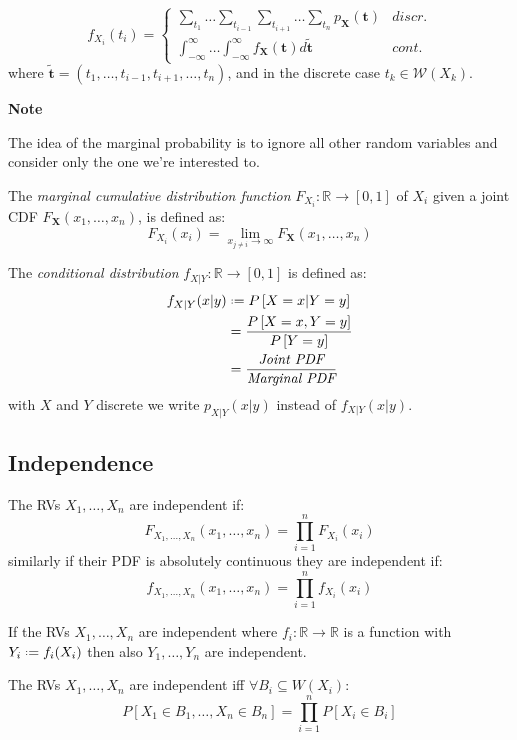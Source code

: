 \documentclass[8pt,a4paper]{extarticle}     %
\newcommand{\R}{\mathbb{R}}
\newcommand{\colnull}{\vfill\null\columnbreak}
\newcommand{\eqdef}{\mathrel{\vcenter{\baselineskip0.5ex\lineskiplimit0pt\hbox{\scriptsize.}\hbox{\scriptsize.}}}=}
\newcommand{\limcont}[3]{\lim\limits_{#1 \rightarrow #2}{#3}}
\renewcommand{\vec}[1]{\mathbf{#1}}
\begin{document}
\begin{multicols}{4}
\begin{boxdefinition}
	\[
		f_{X_i}(t_i) =
		\begin{cases}
			\displaystyle \sum_{t_1}\dots\sum_{t_{i-1}}\sum_{t_{i+1}}\dots\sum_{t_n} p_{\vec{X}}(\vec{t})  &\textit{discr.}\\[2em]
			\displaystyle \int_{-\infty}^{\infty}\dots\int_{-\infty}^{\infty} f_{\vec{X}}(\vec{t})d\vec{\tilde t} &\textit{cont.}
		\end{cases}
	\]
	where $\vec{\tilde t}=(t_1,\dots,t_{i-1},t_{i+1},\dots,t_n)$, and in the discrete case $t_k\in\mathcal{W}(X_k)$. 
\end{boxdefinition}
\begin{listb}
	\item [] \textbf{Note}
	\item The idea of the marginal probability is to ignore all other random variables and consider only the one we're interested to. 
\end{listb}
\begin{boxdefinition} 
	The \textit{marginal cumulative distribution function} $F_{X_i}:\R\rightarrow[0,1]$ of $X_i$ given a joint CDF $F_{\vec{X}}(x_1,\dots,x_n)$, is defined as:
	\[
		F_{X_i}(x_i) = \limcont{x_{j\neq i}}{\infty}{F_{\vec{X}}(x_1,\dots,x_n)}
	\]
\end{boxdefinition}
\begin{boxdefinition} 
	The \textit{conditional distribution} $f_{X|Y}:\R\rightarrow[0,1]$ is defined as:
	\[
		\begin{split}
			f_{X|Y}(x|y) 
			&\eqdef P\left[X=x|Y=y\right] \\ 
			&= \frac{P\left[X=x,Y=y\right]}{P\left[Y=y\right]}\\
			&= \frac{\textit{Joint PDF}}{\textit{Marginal PDF}}\\
		\end{split}
	\]
	with $X$ and $Y$ discrete we write $p_{X|Y}(x|y)$ instead of $f_{X|Y}(x|y)$.
\end{boxdefinition}
\subsection{Independence}
\begin{boxdefinition}[Independence] 
	The RVs $X_1,\dots,X_n$ are independent if:
	\[
		F_{X_1,\dots,X_n}(x_1,\dots,x_n) = \prod_{i=1}^{n} F_{X_i}(x_i)
	\]
	similarly if their PDF is absolutely continuous they are independent if:
	\[
		f_{X_1,\dots,X_n}(x_1,\dots,x_n) = \prod_{i=1}^{n} f_{X_i}(x_i)
	\]
\end{boxdefinition}
\begin{boxtheorem} 
	If the RVs $X_1,\dots,X_n$ are independent where $f_i:\R\rightarrow\R$ is a function with $Y_i\eqdef f_i(X_i)$ then also $Y_1,\dots,Y_n$ are independent. 
\end{boxtheorem}
\begin{boxtheorem} 
	The RVs $X_1,\dots,X_n$ are independent iff $\forall B_i \subseteq W(X_i)$:
	\[
		P\left[X_1\in B_1,\dots,X_n\in B_n\right] = \prod_{i=1}^{n} P\left[X_i\in B_i\right]
	\]
\end{boxtheorem}
\colnull 

\end{multicols}
\end{document}
